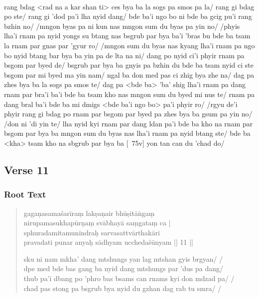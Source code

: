 \documentclass[12pt]{article}
\begin{document}
\textbf{\TVB}\\
rang bdag <rad na a kar shan ti> ces bya ba la sogs pa smos pa la/ rang gi bdag po ste/ rang gi 'dod pa'i lha nyid dang/ bde ba'i ngo bo ni bde ba gcig pu'i rang bzhin no/ /mngon byas pa ni kun nas mngon sum du byas pa yin no/ /phyis lha'i rnam pa nyid yongs su btang nas bsgrub par bya ba'i 'bras bu bde ba tsam la rnam par gnas par 'gyur ro/ /mngon sum du byas nas kyang lha'i rnam pa ngo bo nyid btang bar bya ba yin pa de lta na ni/ dang po nyid ci'i phyir rnam pa bsgom par byed de/ bsgrub par bya ba gnyis pa bzhin du bde ba tsam nyid ci ste bsgom par mi byed ma yin nam/ ngal ba don med pas ci zhig bya zhe na/ dag pa zhes bya ba la sogs pa smos te/ dag pa <bde ba> 'ba' shig lha'i rnam pa dang rnam par bra'i ba'i bde ba tsam kho nas mngon sum du byed mi nus te/ rnam pa dang bral ba'i bde ba mi dmigs <bde ba'i ngo bo> pa'i phyir ro/ /rgyu de'i phyir rang gi bdag po rnam par bsgom par byed pa zhes bya ba gsum pa yin no/ /don ni 'di yin te/ lha nyid kyi rnam par dang ldan pa'i bde ba kho na rnam par bsgom par bya ba mngon sum du byas nas lha'i rnam pa nyid btang ste/ bde ba <kha> tsam kho na sbgrub par bya ba [\TVB\ 75v] yon tan can du 'chad do/ 

\subsection{Verse 11}
\subsubsection{Root Text}
\begin{quote}
	gagaṇasamaśarīraṃ lakṣaṇair bhūṣitāṅgaṃ \\
	nirupamasukhapūrṇaṃ\footnoteB{
		nirupama°] \EDD ; nirupama° \MS
	} svābhayā saṃgataṃ ca |\\
	sphuradamitamunīndraḥ sarvasattvārthakāri \\
	pravadati punar anyaḥ sādhyam ucchedaśūnyam || 11 ||

	sku ni nam mkha' dang mtshungs yan lag mtshan gyis brgyan/ /\\
	dpe med bde bas gang ba nyid dang mtshungs par 'dus pa dang/ \\
	thub pa'i dbang po 'phro bas bsams can rnams kyi don mdzad pa/ /\\
	chad pas stong pa bsgrub bya nyid du gzhan dag rab tu smra/ /
\end{quote}
\end{document}
